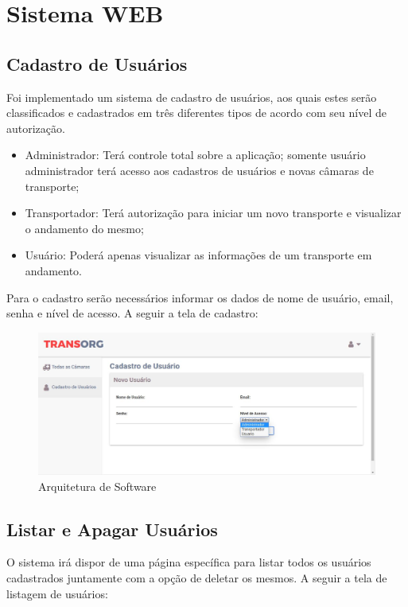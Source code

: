 			
			
\section{Sistema WEB}

\subsection{Cadastro de Usuários}
	Foi implementado um sistema de cadastro de usuários, aos quais estes serão classificados e cadastrados em três diferentes tipos de acordo com seu nível de autorização.

\begin{itemize}
\item Administrador: Terá controle total sobre a aplicação; somente usuário administrador terá acesso aos cadastros de usuários e novas câmaras de transporte;
\item Transportador:  Terá autorização para iniciar um novo transporte e visualizar o andamento do mesmo;
\item Usuário: Poderá apenas visualizar as informações de um transporte em andamento.
\end{itemize}

	Para o cadastro serão necessários informar os dados de nome de usuário, email, senha e nível de acesso. A seguir a tela de cadastro:

\begin{figure}[H]
\centering
\includegraphics[width=16cm]{figuras/cadastro_software.JPG}
\caption{Arquitetura de Software}
\end{figure}

\subsection{Listar e Apagar Usuários}
	O sistema irá dispor de uma página específica para listar todos os usuários cadastrados juntamente com a opção de deletar os mesmos. A seguir a tela de listagem de usuários:

